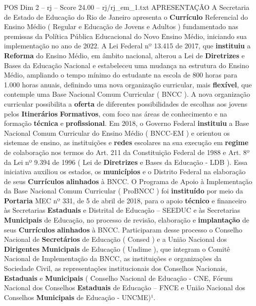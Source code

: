 \begin{textsample}{POS Dim 2 – rj – Score 24.00 – rj/rj\_em\_1.txt}  \label{ex:f2_pos_231}
APRESENTAÇÃO A Secretaria de Estado de Educação do Rio de Janeiro apresenta o \textbf{Currículo} Referencial do Ensino Médio ( Regular e Educação de Jovens e Adultos ) fundamentado nas premissas da Política Pública Educacional do Novo Ensino Médio, iniciando sua implementação no ano de 2022.
A Lei Federal nº 13.415 de 2017, que \textbf{instituiu} a \textbf{Reforma} do Ensino Médio, em âmbito nacional, alterou a Lei de \textbf{Diretrizes} e Bases da Educação Nacional e estabeleceu uma mudança na estrutura do Ensino Médio, ampliando o tempo mínimo do estudante na escola de 800 horas para 1.000 horas anuais, definindo uma nova organização curricular, mais \textbf{flexível}, que contemple uma Base Nacional Comum Curricular ( BNCC ).
A nova organização curricular possibilita a \textbf{oferta} de diferentes possibilidades de escolhas aos jovens pelos \textbf{Itinerários} \textbf{Formativos}, com foco nas áreas de conhecimento e na formação \textbf{técnica} e \textbf{profissional}.
Em 2018, o Governo Federal \textbf{instituiu} a Base Nacional Comum Curricular do Ensino Médio ( BNCC-EM ) e orientou os sistemas de ensino, as instituições e \textbf{redes} escolares na sua execução em \textbf{regime} de colaboração nos termos do Art. 211 da Constituição Federal de 1988 e Art. 8º da Lei nº 9.394 de 1996 ( Lei de \textbf{Diretrizes} e Bases da Educação - LDB ).
Essa iniciativa auxiliou os estados, os \textbf{municípios} e o Distrito Federal na elaboração de seus \textbf{Currículos} \textbf{alinhados} à BNCC.
O Programa de Apoio à Implementação da Base Nacional Comum Curricular ( ProBNCC ) foi \textbf{instituído} por meio da \textbf{Portaria} MEC nº 331, de 5 de abril de 2018, para o apoio \textbf{técnico} e financeiro às Secretarias \textbf{Estaduais} e Distrital de Educação – SEEDUC e às Secretarias \textbf{Municipais} de Educação, no processo de revisão, elaboração e \textbf{implantação} de seus \textbf{Currículos} \textbf{alinhados} à BNCC.
Participaram desse processo o Conselho Nacional de \textbf{Secretários} de Educação ( Consed ) e a União Nacional dos \textbf{Dirigentes} \textbf{Municipais} de Educação ( Undime ), que integram o Comitê Nacional de Implementação da BNCC, as instituições e organizações da Sociedade Civil, as representações institucionais dos Conselhos Nacionais, \textbf{Estaduais} e \textbf{Municipais} ( Conselho Nacional de Educação - CNE, Fórum Nacional dos Conselhos \textbf{Estaduais} de Educação – FNCE e União Nacional dos Conselhos \textbf{Municipais} de Educação - UNCME)¹.

\end{textsample}
